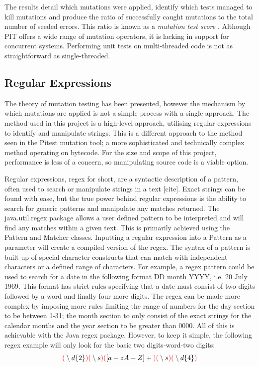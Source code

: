 \documentclass[a4paper,12pt]{article}
\begin{document}
The results detail which mutations were applied, identify which tests managed to kill mutations and produce the ratio of successfully caught mutations to the total number of seeded errors. This ratio is known as a \textit{mutation test score} \citep{bradbury06}. Although PIT offers a wide range of mutation operators, it is lacking in support for concurrent systems. Performing unit tests on multi-threaded code is not as straightforward as single-threaded.


\subsection{Regular Expressions}    

The theory of mutation testing has been presented, however the mechanism by which mutations are applied is not a simple process with a single approach. The method used in this project is a high-level approach, utilising regular expressions to identify and manipulate strings. This is a different approach to the method seen in the Pitest mutation tool; a more sophisticated and technically complex method operating on bytecode. For the size and scope of this project, performance is less of a concern, so manipulating source code is a viable option. 

Regular expressions, regex for short, are a syntactic description of a pattern, often used to search or manipulate strings in a text [cite]. Exact strings can be found with ease, but the true power behind regular expressions is the ability to search for generic patterns and manipulate any matches returned. The java.util.regex package allows a user defined pattern to be interpreted and will find any matches within a given text. This is primarily achieved using the Pattern and Matcher classes. Inputting a regular expression into a Pattern as a parameter will create a compiled version of the regex. The syntax of a pattern is built up of special character constructs that can match with independent characters or a defined range of characters. For example, a regex pattern could be used to search for a date in the following format DD month YYYY, i.e. 20 July 1969. This format has strict rules specifying that a date must consist of two digits followed by a word and finally four more digits. The regex can be made more complex by imposing more rules limiting the range of numbers for the day section to be between 1-31; the month section to only consist of the exact strings for the calendar months and the year section to be greater than 0000. All of this is achievable with the Java regex package. However, to keep it simple, the following regex example will only look for the basic two digits-word-two digits:
\begin{equation}
    \textbf{$\color{red}($} \setminus d\{2\} \textbf{$\color{red})($} \setminus s \textbf{$\color{red})($} [a-zA-Z]+ \textbf{$\color{red})($} \setminus s \textbf{$\color{red})($} \setminus d\{4\} \textbf{$\color{red})$}
\end{equation}
\end{document}
